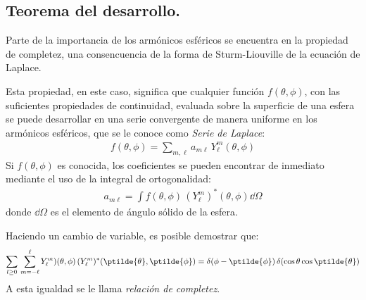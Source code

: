 \subsection{Teorema del desarrollo.}
Parte de la importancia de los armónicos esféricos se encuentra en la propiedad de completez, una consencuencia de la forma de Sturm-Liouville de la ecuación de Laplace.
\par
Esta propiedad, en este caso, significa que cualquier función $f(\theta, \phi)$, con las suficientes propiedades de continuidad, evaluada sobre la superficie de una esfera se puede desarrollar en una serie convergente de manera uniforme en los armónicos esféricos, que se le conoce como \emph{Serie de Laplace}:
\begin{align}
f(\theta, \phi) = \sum_{m, \ell} a_{m \ell} \, Y_{\ell}^{m} (\theta, \phi)
\label{eq:ecuacion_12_151}
\end{align}
Si $f(\theta, \phi)$ es conocida, los coeficientes se pueden encontrar de inmediato mediante el uso de la integral de ortogonalidad:
\begin{align}
a_{m \ell} = \int f(\theta, \phi) \, (Y_{\ell}^{m})^{*} (\theta, \phi) \dd{\Omega}
\label{eq:ecuacion_10_237}
\end{align}
donde $\dd{\Omega}$ es el elemento de ángulo sólido de la esfera.
\par
Haciendo un cambio de variable, es posible demostrar que:
\begin{align}
\sum_{l \geq 0} \, \sum_{m=-\ell}^{\ell} Y_{\ell}^{m}) (\theta, \phi) \, (Y_{\ell}^{m})^{*} (\ptilde{\theta}, \ptilde{\phi}) = \delta(\phi - \ptilde{\phi}) \, \delta(\cos \theta  \cos \ptilde{\theta})
\label{eq:ecuacion_10_238}
\end{align}
A esta igualdad se le llama \emph{relación de completez}.
